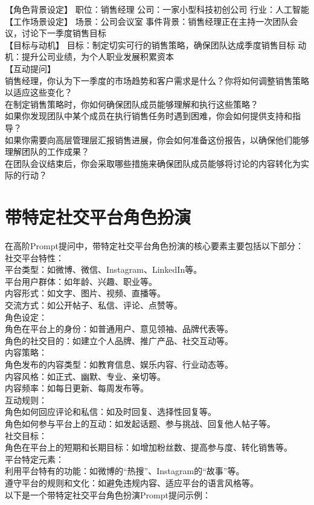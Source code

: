 \documentclass[12pt]{book}
\begin{document}
【角色背景设定】 职位：销售经理 公司：一家小型科技初创公司 行业：人工智能\\

【工作场景设定】 场景：公司会议室 事件背景：销售经理正在主持一次团队会议，讨论下一季度销售目标\\

【目标与动机】 目标：制定切实可行的销售策略，确保团队达成季度销售目标 动机：提升公司业绩，为个人职业发展积累资本\\

【互动提问】\\

销售经理，你认为下一季度的市场趋势和客户需求是什么？你将如何调整销售策略以适应这些变化？\\
在制定销售策略时，你如何确保团队成员能够理解和执行这些策略？\\
如果你发现团队中某个成员在执行销售任务时遇到困难，你会如何提供支持和指导？\\
如果你需要向高层管理层汇报销售进展，你会如何准备这份报告，以确保他们能够理解团队的工作成果？\\
在团队会议结束后，你会采取哪些措施来确保团队成员能够将讨论的内容转化为实际的行动？\\

\section{带特定社交平台角色扮演}
在高阶Prompt提问中，带特定社交平台角色扮演的核心要素主要包括以下部分：\\

社交平台特性：\\
平台类型：如微博、微信、Instagram、LinkedIn等。\\
平台用户群体：如年龄、兴趣、职业等。\\
内容形式：如文字、图片、视频、直播等。\\
交流方式：如公开帖子、私信、评论、点赞等。\\
角色设定：\\
角色在平台上的身份：如普通用户、意见领袖、品牌代表等。\\
角色的社交目的：如建立个人品牌、推广产品、社交互动等。\\
内容策略：\\
角色发布的内容类型：如教育信息、娱乐内容、行业动态等。\\
内容风格：如正式、幽默、专业、亲切等。\\
内容频率：如每日更新、每周发布等。\\
互动规则：\\
角色如何回应评论和私信：如及时回复、选择性回复等。\\
角色如何参与平台上的互动：如发起话题、参与挑战、回复他人帖子等。\\
社交目标：\\
角色在平台上的短期和长期目标：如增加粉丝数、提高参与度、转化销售等。\\
平台特定元素：\\
利用平台特有的功能：如微博的“热搜”、Instagram的“故事”等。\\
遵守平台的规则和文化：如避免违规内容、适应平台的语言风格等。\\
以下是一个带特定社交平台角色扮演Prompt提问示例：\\
\end{document}
